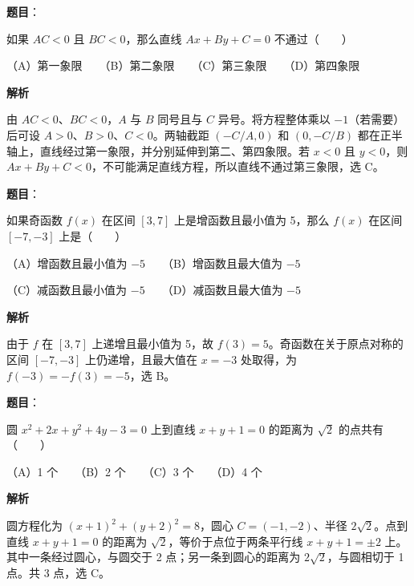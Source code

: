 \begin{answer}

\textbf{题目}：

如果 $AC<0$ 且 $BC<0$，那么直线 $Ax+By+C=0$ 不通过\mbox{（　　）}

（A）第一象限　　（B）第二象限　　（C）第三象限　　（D）第四象限

\textbf{解析}

由 $AC<0$、$BC<0$，$A$ 与 $B$ 同号且与 $C$ 异号。将方程整体乘以 $-1$（若需要）后可设 $A>0$、$B>0$、$C<0$。两轴截距 $(-C/A,0)$ 和 $(0,-C/B)$ 都在正半轴上，直线经过第一象限，并分别延伸到第二、第四象限。若 $x<0$ 且 $y<0$，则 $Ax+By+C<0$，不可能满足直线方程，所以直线不通过第三象限，选 C。


\end{answer}
\begin{answer}

\textbf{题目}：

如果奇函数 $f(x)$ 在区间 $[3,7]$ 上是增函数且最小值为 5，那么 $f(x)$ 在区间 $[-7,-3]$ 上是\mbox{（　　）}

（A）增函数且最小值为 $-5$　　（B）增函数且最大值为 $-5$

（C）减函数且最小值为 $-5$　　（D）减函数且最大值为 $-5$

\textbf{解析}

由于 $f$ 在 $[3,7]$ 上递增且最小值为 5，故 $f(3)=5$。奇函数在关于原点对称的区间 $[-7,-3]$ 上仍递增，且最大值在 $x=-3$ 处取得，为 $f(-3)=-f(3)=-5$，选 B。


\end{answer}
\begin{answer}

\textbf{题目}：

圆 $x^2+2x+y^2+4y-3=0$ 上到直线 $x+y+1=0$ 的距离为 $\sqrt2$ 的点共有\mbox{（　　）}

（A）1 个　　（B）2 个　　（C）3 个　　（D）4 个

\textbf{解析}

圆方程化为 $(x+1)^2+(y+2)^2=8$，圆心 $C=(-1,-2)$、半径 $2\sqrt2$。点到直线 $x+y+1=0$ 的距离为 $\sqrt2$，等价于点位于两条平行线 $x+y+1=\pm2$ 上。其中一条经过圆心，与圆交于 2 点；另一条到圆心的距离为 $2\sqrt2$，与圆相切于 1 点。共 3 点，选 C。


\end{answer}
